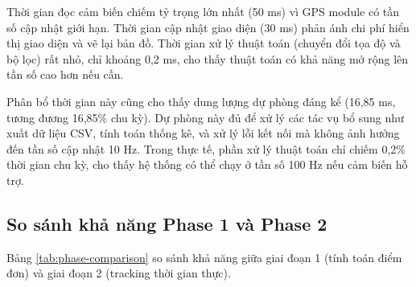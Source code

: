 \begin{table}[H]
\centering
\caption{Phân bổ thời gian xử lý trong một chu kỳ 100 ms}
\label{tab:time-budget}
\end{table}

Thời gian đọc cảm biến chiếm tỷ trọng lớn nhất (50 ms) vì GPS module có tần số cập nhật giới hạn. Thời gian cập nhật giao diện (30 ms) phản ánh chi phí hiển thị giao diện và vẽ lại bản đồ. Thời gian xử lý thuật toán (chuyển đổi tọa độ và bộ lọc) rất nhỏ, chỉ khoảng 0,2 ms, cho thấy thuật toán có khả năng mở rộng lên tần số cao hơn nếu cần.

Phân bổ thời gian này cũng cho thấy dung lượng dự phòng đáng kể (16,85 ms, tương đương 16,85\% chu kỳ). Dự phòng này đủ để xử lý các tác vụ bổ sung như xuất dữ liệu CSV, tính toán thống kê, và xử lý lỗi kết nối mà không ảnh hưởng đến tần số cập nhật 10 Hz. Trong thực tế, phần xử lý thuật toán chỉ chiếm 0,2\% thời gian chu kỳ, cho thấy hệ thống có thể chạy ở tần số 100 Hz nếu cảm biến hỗ trợ.

\subsection{So sánh khả năng Phase 1 và Phase 2}

\hspace{0.5cm} Bảng \ref{tab:phase-comparison} so sánh khả năng giữa giai đoạn 1 (tính toán điểm đơn) và giai đoạn 2 (tracking thời gian thực).



